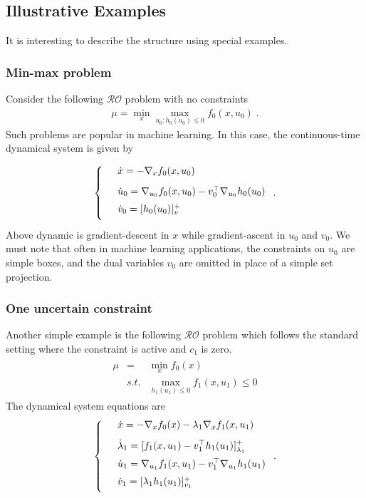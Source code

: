 \documentclass[journal,twoside,web]{ieeecolor}
\newcommand{\rev}[1]{\textcolor{revisionblue}{#1}}
\begin{document}
\subsection*{\rev{Illustrative Examples}} \label{examples_and_comments}
It is interesting to describe the structure using special examples.

\subsubsection{Min-max problem} Consider the following $\mathcal{RO}$ problem with no constraints
\begin{align*}
\mu=\min_x\max_{u_0:h_0(u_0)\leq 0}f_0(x,u_0)\;.
\end{align*}
Such problems are popular in machine learning. In this case, the continuous-time dynamical system is given by

\begin{align*}
\left\{
\begin{array}{cl}
\vspace{3mm}
&\dot{x}=-\nabla_x f_0(x,u_0)\\
\vspace{2mm}
&\dot{u}_0=\nabla_{u_0}f_0(x,u_0)-v_0^\top \nabla_{u_0} h_0(u_0)\\
\vspace{2mm}
&\dot{v}_0=[h_0(u_0)]_v^+
\end{array}\right..
\end{align*}
Above dynamic is gradient-descent in $x$ while gradient-ascent in $u_0$ and $v_0$. We must note that often in machine learning applications, the constraints on $u_0$ are simple boxes, and the dual variables $v_0$ are omitted in place of a simple set projection.

\subsubsection{One uncertain constraint}
Another simple example is the following $\mathcal{RO}$ problem which follows the standard setting where the constraint is active and $c_1$ is zero.
\begin{align*}
\begin{array}{lcl}\mu&=&\displaystyle\min_x f_0(x)\\
&s.t.&\displaystyle \max_{h_1(u_1)\leq 0}f_1(x,u_1)\leq 0
\end{array}
\end{align*}
The dynamical system equations are
\begin{align*}
\left\{
\begin{array}{cl}
\vspace{3mm}
&\dot{x}=-\nabla_x f_0(x)-\lambda_1 \nabla_x f_1(x,u_1)\\
\vspace{2mm}
&\dot{\lambda}_1=[f_1(x,u_1)-v_1^\top h_1(u_1)]_{\lambda_1}^+\\
\vspace{2mm}
&\dot{u}_1=\nabla_{u_1} f_1(x,u_1)-v_1^\top \nabla_{u_1}h_1(u_1)\\
\vspace{2mm}
&\dot{v}_1=[\lambda_1h_1(u_1)]_{v_1}^+
\end{array}\right..
\end{align*}
\end{document}
